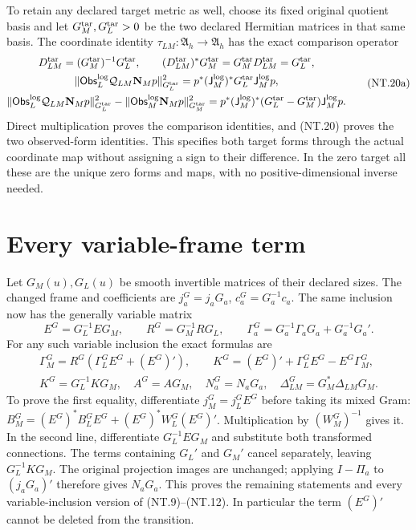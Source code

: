 \documentclass[11pt]{article}
\begin{document}
To retain any declared target metric as well, choose its fixed
original quotient basis and let $G_M^{\rm tar},G_L^{\rm tar}>0$
be the two declared Hermitian matrices in that same basis. The
coordinate identity $\tau_{LM}:\mathfrak A_h\to\mathfrak A_h$
has the exact comparison operator
\[
 \begin{gathered}
 D_{LM}^{\rm tar}=(G_M^{\rm tar})^{-1}G_L^{\rm tar},\qquad
 (D_{LM}^{\rm tar})^*G_M^{\rm tar}
       =G_M^{\rm tar}D_{LM}^{\rm tar}=G_L^{\rm tar},\\
 \|\mathsf{Obs}_L^{\log}\mathcal Q_{LM}\mathbf N_Mp\|_{G_L^{\rm tar}}^2
    =p^*(\mathsf J_M^{\log})^*G_L^{\rm tar}\mathsf J_M^{\log}p,\\
 \|\mathsf{Obs}_L^{\log}\mathcal Q_{LM}\mathbf N_Mp\|_{G_L^{\rm tar}}^2
  -\|\mathsf{Obs}_M^{\log}\mathbf N_Mp\|_{G_M^{\rm tar}}^2
    =p^*(\mathsf J_M^{\log})^*(G_L^{\rm tar}-G_M^{\rm tar})
                                     \mathsf J_M^{\log}p.
 \end{gathered}
 \tag{NT.20a}
\]
Direct multiplication proves the comparison identities, and (NT.20)
proves the two observed-form identities. This specifies both target
forms through the actual coordinate map without assigning a sign
to their difference. In the zero target all these are the unique
zero forms and maps, with no positive-dimensional inverse needed.

\section{Every variable-frame term}

Let $G_M(u),G_L(u)$ be smooth invertible matrices of their declared
sizes. The changed frame and coefficients are
$j_a^G=j_aG_a$, $c_a^G=G_a^{-1}c_a$.
The same inclusion now has the generally variable matrix
\[
 E^G=G_L^{-1}EG_M,\qquad
 R^G=G_M^{-1}RG_L,\qquad
 \Gamma_a^G=G_a^{-1}\Gamma_aG_a+G_a^{-1}G_a'.
 \tag{NT.21}
\]
For any such variable inclusion the exact formulas are
\[
 \begin{gathered}
 \Gamma_M^G=R^G(\Gamma_L^GE^G+(E^G)'),\qquad
 K^G=(E^G)'+\Gamma_L^GE^G-E^G\Gamma_M^G,\\
 K^G=G_L^{-1}KG_M,\quad
 A^G=AG_M,\quad N_a^G=N_aG_a,\quad
 \Delta_{LM}^G=G_M^*\Delta_{LM}G_M.
 \end{gathered}
 \tag{NT.22}
\]
To prove the first equality, differentiate
$j_M^G=j_L^GE^G$ before taking its mixed Gram:
$B_M^G=(E^G)^*B_L^GE^G+(E^G)^*W_L^G(E^G)'$.
Multiplication by $(W_M^G)^{-1}$ gives it.
In the second line, differentiate $G_L^{-1}EG_M$ and substitute
both transformed connections. The terms containing $G_L'$ and
$G_M'$ cancel separately, leaving $G_L^{-1}KG_M$.
The original projection images are unchanged; applying
$I-\Pi_a$ to $(j_aG_a)'$ therefore gives $N_aG_a$.
This proves the remaining statements and every variable-inclusion
version of (NT.9)--(NT.12). In particular the term $(E^G)'$
cannot be deleted from the transition.
\end{document}
